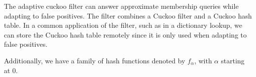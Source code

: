 \documentclass[../paper.tex]{subfiles}
\begin{document}
The adaptive cuckoo filter \cite{adaptive-cuckoo} can answer approximate membership queries while adapting to false positives. The filter combines a Cuckoo filter and a Cuckoo hash table. In a common application of the filter, such as in a dictionary lookup, we can store the Cuckoo hash table remotely since it is only used when adapting to false positives.

Additionally, we have a family of hash functions denoted by $f_\alpha$, with $\alpha$ starting at 0.

\end{document}
